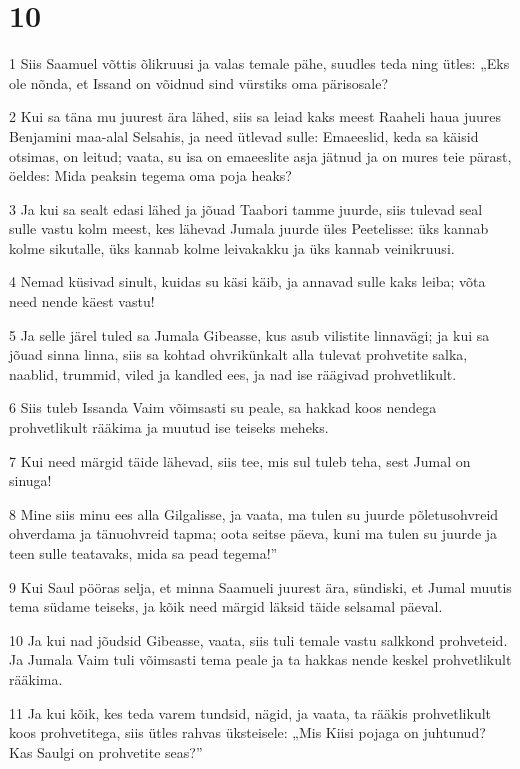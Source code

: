 \chapter{10}

\par 1 Siis Saamuel võttis õlikruusi ja valas temale pähe, suudles teda ning ütles: „Eks ole nõnda, et Issand on võidnud sind vürstiks oma pärisosale?
\par 2 Kui sa täna mu juurest ära lähed, siis sa leiad kaks meest Raaheli haua juures Benjamini maa-alal Selsahis, ja need ütlevad sulle: Emaeeslid, keda sa käisid otsimas, on leitud; vaata, su isa on emaeeslite asja jätnud ja on mures teie pärast, öeldes: Mida peaksin tegema oma poja heaks?
\par 3 Ja kui sa sealt edasi lähed ja jõuad Taabori tamme juurde, siis tulevad seal sulle vastu kolm meest, kes lähevad Jumala juurde üles Peetelisse: üks kannab kolme sikutalle, üks kannab kolme leivakakku ja üks kannab veinikruusi.
\par 4 Nemad küsivad sinult, kuidas su käsi käib, ja annavad sulle kaks leiba; võta need nende käest vastu!
\par 5 Ja selle järel tuled sa Jumala Gibeasse, kus asub vilistite linnavägi; ja kui sa jõuad sinna linna, siis sa kohtad ohvrikünkalt alla tulevat prohvetite salka, naablid, trummid, viled ja kandled ees, ja nad ise räägivad prohvetlikult.
\par 6 Siis tuleb Issanda Vaim võimsasti su peale, sa hakkad koos nendega prohvetlikult rääkima ja muutud ise teiseks meheks.
\par 7 Kui need märgid täide lähevad, siis tee, mis sul tuleb teha, sest Jumal on sinuga!
\par 8 Mine siis minu ees alla Gilgalisse, ja vaata, ma tulen su juurde põletusohvreid ohverdama ja tänuohvreid tapma; oota seitse päeva, kuni ma tulen su juurde ja teen sulle teatavaks, mida sa pead tegema!”
\par 9 Kui Saul pööras selja, et minna Saamueli juurest ära, sündiski, et Jumal muutis tema südame teiseks, ja kõik need märgid läksid täide selsamal päeval.
\par 10 Ja kui nad jõudsid Gibeasse, vaata, siis tuli temale vastu salkkond prohveteid. Ja Jumala Vaim tuli võimsasti tema peale ja ta hakkas nende keskel prohvetlikult rääkima.
\par 11 Ja kui kõik, kes teda varem tundsid, nägid, ja vaata, ta rääkis prohvetlikult koos prohvetitega, siis ütles rahvas üksteisele: „Mis Kiisi pojaga on juhtunud? Kas Saulgi on prohvetite seas?”
